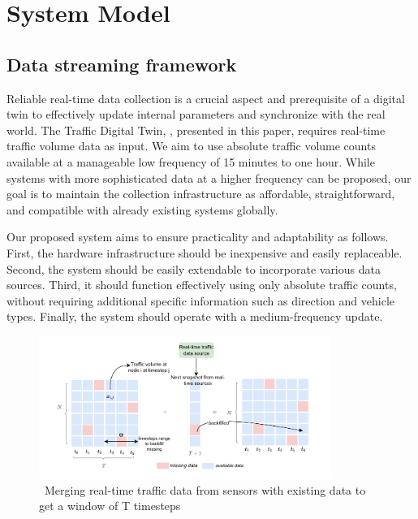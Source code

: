 \section{System Model}\label{sec:system-model}
\subsection{\textbf{Data streaming framework}}

Reliable real-time data collection is a crucial aspect and prerequisite of a digital twin to effectively update internal parameters and synchronize with the real world. The Traffic Digital Twin, \name, presented in this paper, requires real-time traffic volume data as input. We aim to use absolute traffic volume counts available at a manageable low frequency of 15 minutes to one hour. While systems with more sophisticated data at a higher frequency can be proposed, our goal is to maintain the collection infrastructure as affordable, straightforward, and compatible with already existing systems globally. 

Our proposed system aims to ensure practicality and adaptability as follows. First, the hardware infrastructure should be inexpensive and easily replaceable. Second, the system should be easily extendable to incorporate various data sources. Third, it should function effectively using only absolute traffic counts, without requiring additional specific information such as direction and vehicle types. Finally, the system should operate with a medium-frequency update.


\begin{figure}
  \centering
  \includegraphics[width=0.85\textwidth]{backfill_fig.pdf}
  \caption{\name \ Merging real-time traffic data from sensors with existing data to get a window of T timesteps}
  \label{fig:backfill}
\end{figure}

